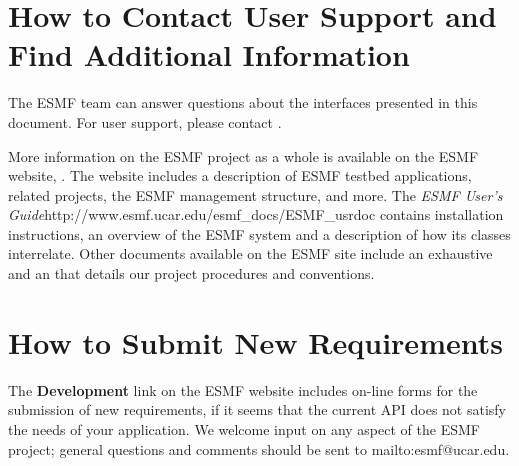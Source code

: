 \section{How to Contact User Support and Find Additional Information}
\label{sec:Support}
The ESMF team can answer questions about the interfaces presented in this 
document.  For user support, please contact 
.  

More information on the ESMF project as a whole is available on the 
ESMF website, .  
The website includes a description of ESMF testbed applications, related projects,
the ESMF management structure, and more.  The \htmladdnormallink
{{\it ESMF User's Guide}}{http://www.esmf.ucar.edu/esmf_docs/ESMF_usrdoc} contains 
installation instructions, an overview of the ESMF system and a description of 
how its classes interrelate.
Other documents available on the ESMF site include an exhaustive
and an  
that details our project procedures and conventions.
 
\section{How to Submit New Requirements}
\label{sec:Submission}
The {\bf Development}
link on the ESMF website includes on-line forms for the submission of 
new requirements, if it seems that the current API does not satisfy the needs of 
your application.  We welcome input on any aspect of the ESMF project; general
questions and comments should be sent to 
{mailto:esmf@ucar.edu}.







